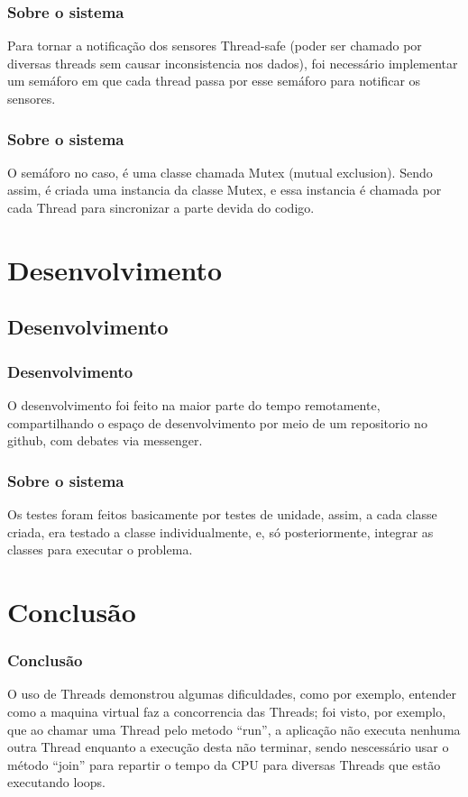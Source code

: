 	\begin{frame}
	\frametitle{Sobre o sistema}
		 \begin{block}{}
				Para tornar a notificação dos sensores Thread-safe (poder ser chamado por diversas threads sem causar inconsistencia nos dados), foi necessário implementar um semáforo em que cada thread passa por esse semáforo para notificar os sensores.
		 \end{block}
	\end{frame}

	\begin{frame}
	\frametitle{Sobre o sistema}
		 \begin{block}{}
				O semáforo no caso, é uma classe chamada Mutex (mutual exclusion). Sendo assim, é criada uma instancia da classe Mutex, e essa instancia é chamada por cada Thread para sincronizar a parte devida do codigo.
		 \end{block}
	\end{frame}

	\section{Desenvolvimento}
	\subsection{Desenvolvimento}
	\begin{frame}
	\frametitle{Desenvolvimento}
		 \begin{block}{}
				O desenvolvimento foi feito na maior parte do tempo remotamente, compartilhando o espaço de desenvolvimento por meio de um repositorio no github,  com debates via messenger.
		 \end{block}
	\end{frame}

	\begin{frame}
	\frametitle{Sobre o sistema}
		 \begin{block}{}
				Os testes foram feitos basicamente por testes de unidade, assim, a cada classe criada, era testado a classe individualmente, e,  só posteriormente, integrar as classes para executar o problema.
		 \end{block}
	\end{frame}

	\section{Conclusão}
	\begin{frame}
	\frametitle{Conclusão}
		 \begin{block}{}
				O uso de Threads demonstrou algumas dificuldades, como por exemplo, entender como a maquina virtual faz a concorrencia das Threads; foi visto, por exemplo, que ao chamar uma Thread pelo metodo “run”, a aplicação não executa nenhuma outra Thread enquanto a execução desta não terminar, sendo nescessário usar o método “join” para repartir o tempo da CPU para diversas Threads que estão executando loops.
		 \end{block}
	\end{frame}


